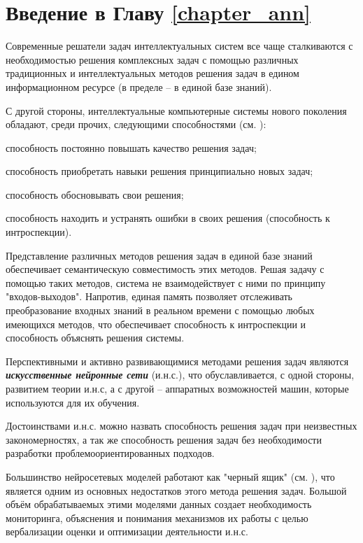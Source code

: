\section*{Введение в Главу \ref{chapter_ann}}

Современные решатели задач интеллектуальных систем все чаще сталкиваются с необходимостью решения комплексных задач с помощью различных традиционных и интеллектуальных методов решения задач в едином информационном ресурсе (в пределе -- в единой базе знаний).

С другой стороны, интеллектуальные компьютерные системы нового поколения обладают, среди прочих, следующими способностями (см. ):
\begin{textitemize}
	\item способность постоянно повышать качество решения задач;
	\item способность приобретать навыки решения принципиально новых задач;
	\item способность обосновывать свои решения;
	\item способность находить и устранять ошибки в своих решения (способность к интроспекции).
\end{textitemize}

Представление различных методов решения задач в единой базе знаний обеспечивает семантическую совместимость этих методов. Решая задачу с помощью таких методов, система не взаимодействует с ними по принципу "входов-выходов". Напротив, единая память позволяет отслеживать преобразование входных знаний в реальном времени с помощью любых имеющихся методов, что обеспечивает способность к интроспекции и способность объяснять решения системы.

Перспективными и активно развивающимися методами решения задач являются \textbf{\textit{искусственные нейронные сети}} (и.н.с.), что обуславливается, с одной стороны, развитием теории и.н.с, а с другой -- аппаратных возможностей машин, которые используются для их обучения.

Достоинствами и.н.с. можно назвать способность решения задач при неизвестных закономерностях, а так же способность решения задач без необходимости разработки проблемоориентированных подходов.

Большинство нейросетевых моделей работают как "черный ящик" (см. ), что является одним из основных недостатков этого метода решения задач. Большой объём обрабатываемых этими моделями данных создает необходимость мониторинга, объяснения и понимания механизмов их работы с целью вербализации оценки и оптимизации деятельности и.н.с.

